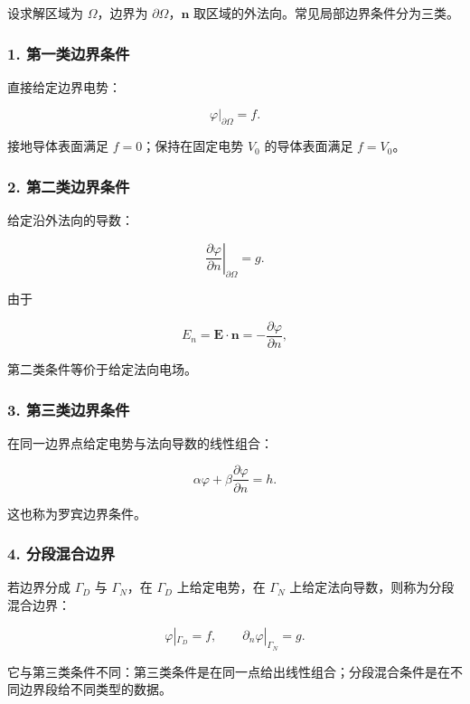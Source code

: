 设求解区域为 \(\Omega\)，边界为 \(\partial\Omega\)，\(\mathbf n\)
取区域的外法向。常见局部边界条件分为三类。

\subsubsection{1.
第一类边界条件}\label{m2:ux7b2cux4e00ux7c7bux8fb9ux754cux6761ux4ef6-1}

直接给定边界电势：

\[
\boxed{
\varphi|_{\partial\Omega}=f
}.
\]

接地导体表面满足 \(f=0\)；保持在固定电势 \(V_0\) 的导体表面满足
\(f=V_0\)。

\subsubsection{2.
第二类边界条件}\label{m2:ux7b2cux4e8cux7c7bux8fb9ux754cux6761ux4ef6-1}

给定沿外法向的导数：

\[
\boxed{
\left.\frac{\partial\varphi}{\partial n}
\right|_{\partial\Omega}=g
}.
\]

由于

\[
E_n=\mathbf E\cdot\mathbf n
=-\frac{\partial\varphi}{\partial n},
\]

第二类条件等价于给定法向电场。

\subsubsection{3.
第三类边界条件}\label{m2:ux7b2cux4e09ux7c7bux8fb9ux754cux6761ux4ef6}

在同一边界点给定电势与法向导数的线性组合：

\[
\boxed{
\alpha\varphi+
\beta\frac{\partial\varphi}{\partial n}=h
}.
\]

这也称为罗宾边界条件。

\subsubsection{4.
分段混合边界}\label{m2:ux5206ux6bb5ux6df7ux5408ux8fb9ux754c}

若边界分成 \(\Gamma_D\) 与 \(\Gamma_N\)，在 \(\Gamma_D\) 上给定电势，在
\(\Gamma_N\) 上给定法向导数，则称为分段混合边界：

\[
\varphi|_{\Gamma_D}=f,
\qquad
\partial_n\varphi|_{\Gamma_N}=g.
\]

它与第三类条件不同：第三类条件是在同一点给出线性组合；分段混合条件是在不同边界段给不同类型的数据。

